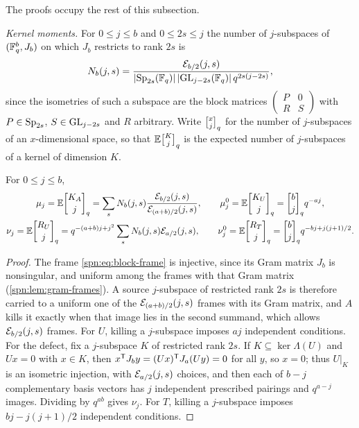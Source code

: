 The proofs occupy the rest of this subsection.

\emph{Kernel moments.} For $0\le j\le b$ and $0\le2s\le j$ the number of $j$-subspaces of
$(\mathbb{F}_q^b,J_b)$ on which $J_b$ restricts to rank $2s$ is
\begin{equation}\label{spn:eq:type-count}
 N_b(j,s)=\frac{\mathcal{E}_{b/2}(j,s)}{\lvert\operatorname{Sp}_{2s}(\mathbb{F}_q)\rvert\,\lvert\operatorname{GL}_{j-2s}(\mathbb{F}_q)\rvert\,q^{2s(j-2s)}},
\end{equation}
since the isometries of such a subspace are the block matrices
$\left(\begin{smallmatrix}P&0\\R&S\end{smallmatrix}\right)$ with $P\in\operatorname{Sp}_{2s}$, $S\in\operatorname{GL}_{j-2s}$
and $R$ arbitrary. Write $\spnqbin{x}{j}{q}$ for the number of $j$-subspaces of an
$x$-dimensional space, so that $\spnE\spnqbin{K}{j}{q}$ is the expected number of $j$-subspaces of
a kernel of dimension $K$.

\begin{lemma}\label{spn:lem:block-moments}
For $0\le j\le b$,
\begin{gather*}
 \mu_j=\spnE\spnqbin{K_A}{j}{q}=\sum_sN_b(j,s)\frac{\spnEmb_{b/2}(j,s)}{\spnEmb_{(a+b)/2}(j,s)},\qquad
 \mu_j^0=\spnE\spnqbin{K_U}{j}{q}=\spnqbin{b}{j}{q}q^{-aj},\\
 \nu_j=\spnE\spnqbin{R_U}{j}{q}=q^{-(a+b)j+j^2}\sum_sN_b(j,s)\spnEmb_{a/2}(j,s),\qquad
 \nu_j^0=\spnE\spnqbin{R_T}{j}{q}=\spnqbin{b}{j}{q}q^{-bj+j(j+1)/2}.
\end{gather*}
\end{lemma}

\begin{proof}
The frame \eqref{spn:eq:block-frame} is injective, since its Gram matrix $J_b$ is nonsingular, and
uniform among the frames with that Gram matrix (\cref{spn:lem:gram-frames}). A source $j$-subspace
of restricted rank $2s$ is therefore carried to a uniform one of the $\mathcal{E}_{(a+b)/2}(j,s)$
frames with its Gram matrix, and $A$ kills it exactly when that image lies in the second summand,
which allows $\mathcal{E}_{b/2}(j,s)$ frames. For $U$, killing a $j$-subspace imposes $aj$ independent
conditions. For the defect, fix a $j$-subspace $K$ of restricted rank $2s$. If
$K\subseteq\ker\Lambda(U)$ and $Ux=0$ with $x\in K$, then
$x^{\mathsf{T}}J_by=(Ux)^{\mathsf{T}}J_a(Uy)=0$ for all $y$, so $x=0$; thus $U|_K$ is an isometric
injection, with $\mathcal{E}_{a/2}(j,s)$ choices, and then each of $b-j$ complementary basis vectors
has $j$ independent prescribed pairings and $q^{a-j}$ images. Dividing by $q^{ab}$ gives $\nu_j$.
For $T$, killing a $j$-subspace imposes $bj-j(j+1)/2$ independent conditions.
\end{proof}


